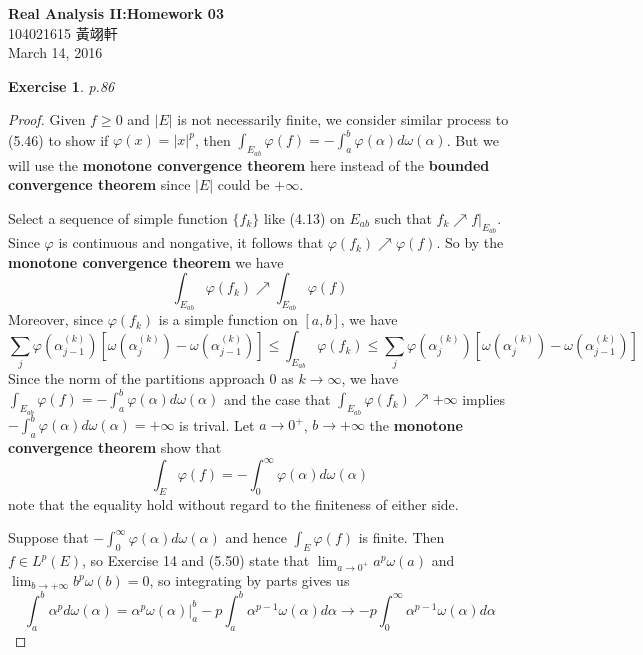 \documentclass[11pt,a4paper]{article}
\newcommand{\alp}{\alpha}
\renewcommand{\(}{\left(}
\renewcommand{\)}{\right)}
\renewcommand{\[}{\left[}
\renewcommand{\]}{\right]}
\renewcommand{\title}{Real Analysis II:\quad Homework 03}
\renewcommand{\author}{104021615 黃翊軒}
\renewcommand{\maketitle}{\begin{center}\textbf{\Large\title}\\[6pt] {\author}\\[6pt] {\color{Gray}\footnotesize March 14, 2016}\end{center}}
\newcommand{\bfL}{\text{\boldmath $L$}}
\newcommand{\bfone}{\text{\boldmath $1$}}
\newtheorem{exercise}{Exercise}
\begin{document}
  \maketitle
  
  
  \setcounter{exercise}{15}
  
  \begin{exercise}
  	p.86
  \end{exercise}
  \begin{proof}
  	Given $f \ge 0$ and $|E|$ is not necessarily finite, we consider similar process to (5.46) to show if $\varphi(x)=|x|^p$, then $\int_{E_{ab}}\varphi(f)=-\int_{a}^{b}\varphi(\alpha)d\omega(\alp)$. But we will use the \textbf{monotone convergence theorem} here instead of the \textbf{bounded convergence theorem} since $|E|$ could be $+\infty$.
  	 	
  	Select a sequence of simple function $\{f_k\}$ like (4.13) on $E_{ab}$ such that $f_k \nearrow f|_{E_{ab}}$. Since $\varphi$ is continuous and nongative, it follows that $\varphi(f_k)\nearrow \varphi(f)$. So by the \textbf{monotone convergence theorem} we have 
  	$$\int_{E_{ab}}\varphi(f_k) \nearrow \int_{E_{ab}}\varphi(f)
  	$$
  	Moreover, since $\varphi(f_k)$ is a simple function on $[a,b]$, we have 
  	$$\sum_{j}\varphi(\alp_{j-1}^{(k)})[\omega(\alp_j^{(k)})-\omega(\alp_{j-1}^{(k)})]\le \int_{E_{ab}}\varphi(f_k)\le \sum_{j}\varphi(\alp_{j}^{(k)})[\omega(\alp_j^{(k)})-\omega(\alp_{j-1}^{(k)})]
  	$$
  	Since the norm of the partitions approach $0$ as $k\rightarrow \infty$, we have $\int_{E_{ab}}\varphi(f)=-\int_{a}^{b}\varphi(\alpha)d\omega(\alp)$ and the case that $\int_{E_{ab}}\varphi(f_k) \nearrow +\infty$ implies $-\int_{a}^{b}\varphi(\alpha)d\omega(\alp)=+\infty$ is trival. Let $a \rightarrow 0^+$, $b \rightarrow +\infty$ the \textbf{monotone convergence theorem} show that 
  	$$
  	\int_E \varphi(f)=-\int_{0}^{\infty}\varphi(\alp)d\omega(\alp)
  	$$
  	note that the equality hold without regard to the finiteness of either side.
  	
  	Suppose that $-\int_{0}^{\infty}\varphi(\alp)d\omega(\alp)$ and hence $\int_E \varphi(f)$ is finite. Then $f\in L^p(E)$, so Exercise 14 and (5.50) state that $\lim_{a\rightarrow 0^+}a^p\omega(a)$ and $\lim_{b\rightarrow +\infty}b^p\omega(b)=0$, so integrating by parts gives us 
  	$$
  	\int_{a}^{b}\alp^pd\omega(\alp)=\alp^p\omega(\alp)\bigg\vert_a^b -p\int_{a}^{b}\alp^{p-1}\omega(\alp)d\alp\rightarrow -p\int_{0}^{\infty}\alp^{p-1}\omega(\alp)d\alp
  	$$
  	

\end{proof}
\end{document}

